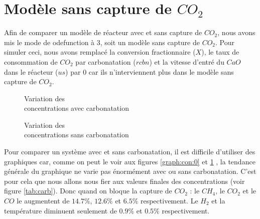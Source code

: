 \documentclass[11pt]{report}
\begin{document}
        \section{Modèle sans capture de $CO_2$}
            Afin de comparer un modèle de réacteur avec et sans capture de $CO_2$,
            nous avons mis le mode de odefunction à 3, soit un modèle sans capture de $CO_2$.
            Pour simuler ceci, nous avons remplacé la conversion fractionnaire ($X$),
            le taux de consommation de $CO_2$ par carbonatation ($rcbn$)
            et la vitesse d'entré du $CaO$ dans le réacteur ($us$)
            par $0$ car ils n'interviennent plus dans le modèle sans capture de $CO_2$.
            \par
            \begin{figure}[h]
                \centering
                \begin{minipage}{0.45\textwidth}
                    \centering
                    \caption{Variation des\\ concentrations avec carbonatation}
                    \label{graph:con:0}
                \end{minipage}
                \begin{minipage}{0.45\textwidth}
                    \centering
                    \caption{Variation des\\ concentrations sans carbonatation}
                    \label{graph:con:1}
                \end{minipage}
            \end{figure}
            Pour comparer un système avec et sans carbonatation,
            il est difficile d'utiliser des graphiques car,
            comme on peut le voir aux figures \ref{graph:con:0} et \ref{graph:con:1} ,
            la tendance générale du graphique ne varie pas énormément avec ou sans carbonatation.
            C'est pour cela que nous allons nous fier aux valeurs finales des concentrations (voir figure \ref{tab:carb}).
            Donc quand on bloque la capture de $CO_2$ : le $CH_4$, le $CO_2$
            et le $CO$  le  augmentent de $14.7\%$, $12.6\%$ et $6.5\%$ respectivement.
            Le $H_2$ et la température diminuent seulement de $0.9\%$ et $0.5\%$ respectivement.
\end{document}
